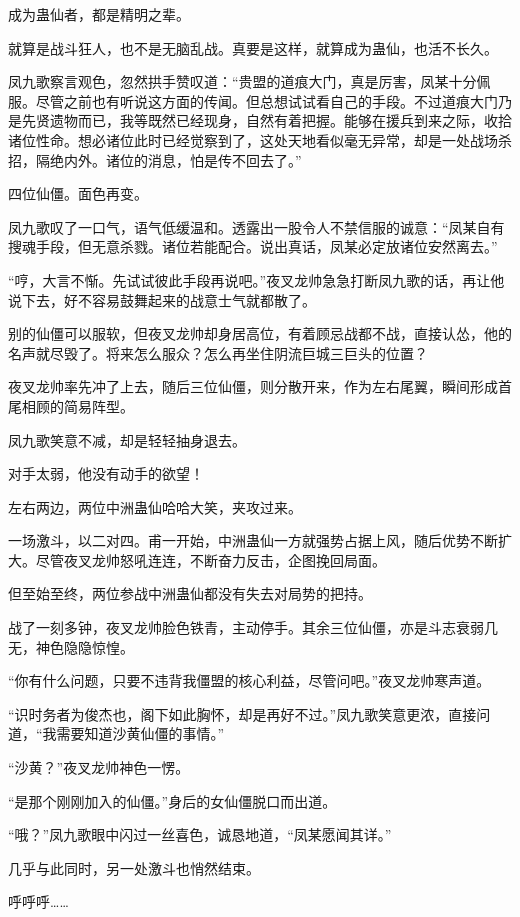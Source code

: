 \begin{this_body}
成为蛊仙者，都是精明之辈。

就算是战斗狂人，也不是无脑乱战。真要是这样，就算成为蛊仙，也活不长久。

凤九歌察言观色，忽然拱手赞叹道：“贵盟的道痕大门，真是厉害，凤某十分佩服。尽管之前也有听说这方面的传闻。但总想试试看自己的手段。不过道痕大门乃是先贤遗物而已，我等既然已经现身，自然有着把握。能够在援兵到来之际，收拾诸位性命。想必诸位此时已经觉察到了，这处天地看似毫无异常，却是一处战场杀招，隔绝内外。诸位的消息，怕是传不回去了。”

四位仙僵。面色再变。

凤九歌叹了一口气，语气低缓温和。透露出一股令人不禁信服的诚意：“凤某自有搜魂手段，但无意杀戮。诸位若能配合。说出真话，凤某必定放诸位安然离去。”

“哼，大言不惭。先试试彼此手段再说吧。”夜叉龙帅急急打断凤九歌的话，再让他说下去，好不容易鼓舞起来的战意士气就都散了。

别的仙僵可以服软，但夜叉龙帅却身居高位，有着顾忌战都不战，直接认怂，他的名声就尽毁了。将来怎么服众？怎么再坐住阴流巨城三巨头的位置？

夜叉龙帅率先冲了上去，随后三位仙僵，则分散开来，作为左右尾翼，瞬间形成首尾相顾的简易阵型。

凤九歌笑意不减，却是轻轻抽身退去。

对手太弱，他没有动手的欲望！

左右两边，两位中洲蛊仙哈哈大笑，夹攻过来。

一场激斗，以二对四。甫一开始，中洲蛊仙一方就强势占据上风，随后优势不断扩大。尽管夜叉龙帅怒吼连连，不断奋力反击，企图挽回局面。

但至始至终，两位参战中洲蛊仙都没有失去对局势的把持。

战了一刻多钟，夜叉龙帅脸色铁青，主动停手。其余三位仙僵，亦是斗志衰弱几无，神色隐隐惊惶。

“你有什么问题，只要不违背我僵盟的核心利益，尽管问吧。”夜叉龙帅寒声道。

“识时务者为俊杰也，阁下如此胸怀，却是再好不过。”凤九歌笑意更浓，直接问道，“我需要知道沙黄仙僵的事情。”

“沙黄？”夜叉龙帅神色一愣。

“是那个刚刚加入的仙僵。”身后的女仙僵脱口而出道。

“哦？”凤九歌眼中闪过一丝喜色，诚恳地道，“凤某愿闻其详。”

几乎与此同时，另一处激斗也悄然结束。

呼呼呼……


\end{this_body}
